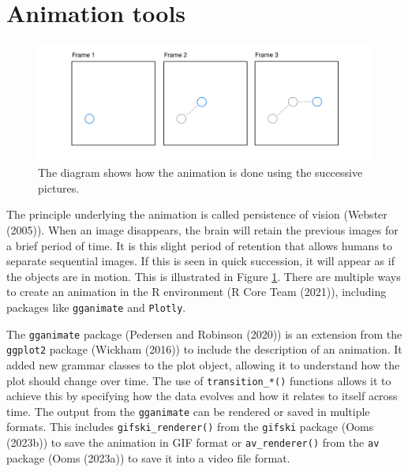 \hypertarget{animation-tools}{%
\section{Animation tools}\label{animation-tools}}

\begin{figure}

{\centering \includegraphics[width=1\linewidth]{figures/animation-diagram} 

}

\caption{The diagram shows how the animation is done using the successive pictures.}\label{fig:animation-diagram}
\end{figure}

The principle underlying the animation is called persistence of vision (Webster (2005)). When an image disappears, the brain will retain the previous images for a brief period of time. It is this slight period of retention that allows humans to separate sequential images. If this is seen in quick succession, it will appear as if the objects are in motion. This is illustrated in Figure \ref{fig:animation-diagram}. There are multiple ways to create an animation in the R environment (R Core Team (2021)), including packages like \texttt{gganimate} and \texttt{Plotly}.

The \texttt{gganimate} package (Pedersen and Robinson (2020)) is an extension from the \texttt{ggplot2} package (Wickham (2016)) to include the description of an animation. It added new grammar classes to the plot object, allowing it to understand how the plot should change over time. The use of \texttt{transition\_*()} functions allows it to achieve this by specifying how the data evolves and how it relates to itself across time. The output from the \texttt{gganimate} can be rendered or saved in multiple formats. This includes \texttt{gifski\_renderer()} from the \texttt{gifski} package (Ooms (2023b)) to save the animation in GIF format or \texttt{av\_renderer()} from the \texttt{av} package (Ooms (2023a)) to save it into a video file format.

